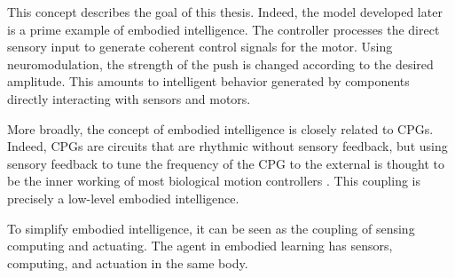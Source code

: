 This concept describes the goal of this thesis.
Indeed, the model developed later is a prime example of embodied intelligence.
The controller processes the direct sensory input to generate coherent control signals for the motor. 
Using neuromodulation, the strength of the push is changed according to the desired amplitude.
This amounts to intelligent behavior generated by components directly interacting with sensors and motors.

More broadly, the concept of embodied intelligence is closely related to CPGs.
Indeed, CPGs are circuits that are rhythmic without sensory feedback, but using sensory feedback to tune the frequency of the CPG to the external is thought to be the inner working of most biological motion controllers \citep{errata1,errata2,errata3}.
This coupling is precisely a low-level embodied intelligence.

To simplify embodied intelligence, it can be seen as the coupling of sensing computing and actuating.
The agent in embodied learning has sensors, computing, and actuation in the same body.
